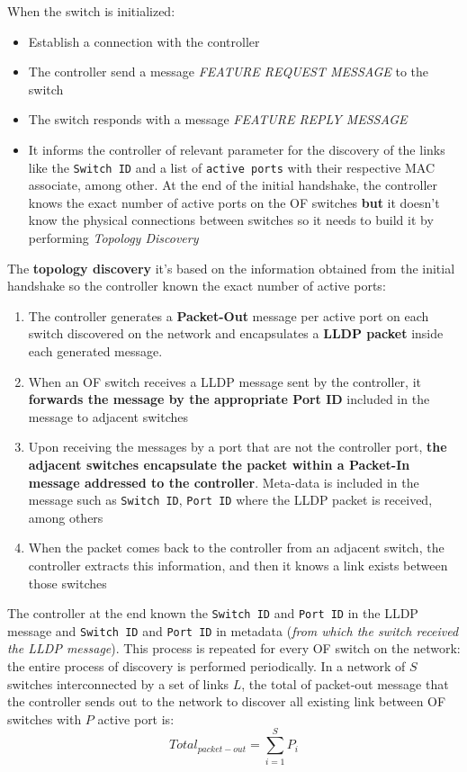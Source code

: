 \documentclass[10pt,a4paper]{report}
\theoremstyle{definition}
\begin{document}
When the switch is initialized:
\begin{itemize}
	\item 
	Establish a connection with the controller
	\item 
	The controller send a message \textit{FEATURE REQUEST MESSAGE} to the switch
	\item 
	The switch responds with a message \textit{FEATURE REPLY MESSAGE}
	\item 
	It informs the controller of relevant parameter for the discovery of the links like the \texttt{Switch ID} and a list of \texttt{active ports} with their respective MAC associate, among other.
	At the end of the initial handshake, the controller knows the exact
	number of active ports on the OF switches \textbf{but} it doesn't know the physical connections between switches so it needs to build it by performing \textit{Topology Discovery}
\end{itemize}

The \textbf{topology discovery} it's based on the information obtained from the initial handshake so the controller known the exact number of active ports:
\begin{enumerate}
	\item 
	The controller generates a \textbf{Packet-Out} message per active port on each switch discovered on the network and encapsulates a \textbf{LLDP packet} inside each generated message.
	\item 
	When an OF switch receives a LLDP message sent by the controller, it \textbf{forwards the message by the appropriate Port ID} included in the message to adjacent switches
	\item 
	Upon receiving the messages by a port that are not the controller port, \textbf{the adjacent switches encapsulate the packet within a Packet-In message addressed to the controller}. Meta-data is included in the message such as \texttt{Switch ID}, \texttt{Port ID} where the LLDP packet is received, among others
	\item 
	When the packet comes back to the controller from an adjacent switch, the controller extracts this information, and then it knows a link exists between those switches
\end{enumerate}

The controller at the end known the \texttt{Switch ID} and \texttt{Port ID} in the LLDP message and \texttt{Switch ID} and \texttt{Port ID} in metadata (\textit{from which the switch received the LLDP message}).
This process is repeated for every OF switch on the network: the entire process of discovery is performed periodically. In a network of $S$ switches interconnected by a set of links $L$, the total of packet-out message that the controller sends out to the network to  discover all existing link between OF switches with $P$ active port is:
\begin{equation}
	Total_{packet-out} = \sum_{i=1}^{S}{P_{i}}
\end{equation}
\end{document}
